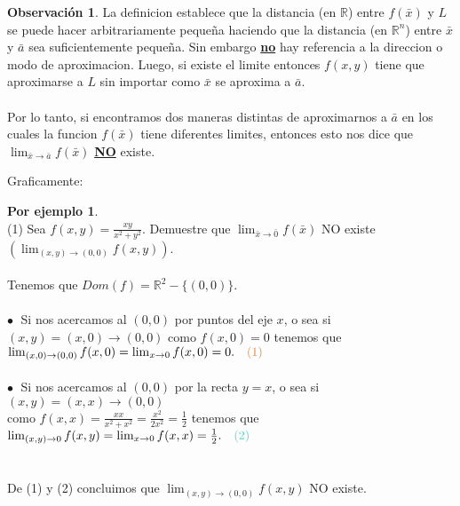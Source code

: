 \documentclass{article}
\theoremstyle{definition}
\newtheorem*{obs}{Observación}
\newtheorem*{ej}{Por ejemplo}
\theoremstyle{remark}
\newcommand\bl{$\bullet\;$}
\begin{document}
\begin{obs}
  La definicion establece que la distancia (en $\mathbb{R}$) entre $f(\bar{x})$ y $L$ se puede hacer arbitrariamente pequeña haciendo que la distancia (en $\mathbb{R}^n$) entre $\bar{x}$ y $\bar{a}$ sea suficientemente pequeña. Sin embargo \underline{\textbf{no}} hay referencia a la direccion o modo de aproximacion. Luego, si existe el limite entonces $f(x,y)$ tiene que aproximarse a $L$ sin importar como $\bar{x}$ se aproxima a $\bar{a}$. \\\\ Por lo tanto, si encontramos dos maneras distintas de aproximarnos a $\bar{a}$ en los cuales la funcion $f(\bar{x})$ tiene diferentes limites, entonces esto nos dice que $\lim_{\bar{x} \to \bar{a}}{f(\bar{x})}$ \underline{\textbf{NO}} existe.
\end{obs}\pagebreak
Graficamente:
\begin{figure}[h]
\centering
\def\svgwidth{0.55\textwidth}

\end{figure}
\begin{ej}
  \; \\
  \textcolor{verdep2}{(1)} Sea $f(x,y)=\frac{xy}{x^2+y^2}$. Demuestre que $\lim_{\bar{x} \to \bar{0}}{f(\bar{x})}$ NO existe $\left(\lim_{(x,y) \to (0,0)}{f(x,y)}\right)$.\\\\
  Tenemos que $Dom(f)=\mathbb{R}^2-\big\{(0,0)\big\}$.\\\\
\textcolor{rojop2}{\bl} Si nos acercamos al $(0,0)$ por puntos del eje $x$, o sea si $(x,y)=(x,0) \to (0,0)$ como $f(x,0)=0$ tenemos que $\lim_{(x,0) \to (0,0)}{f(x,0)}=\lim_{x\to 0}{f(x,0)}=0. \quad \textcolor{rojop2}{(1)}$\\\\
\textcolor{verdep2}{\bl} Si nos acercamos al $(0,0)$ por la recta $y=x$, o sea si $(x,y)=(x,x) \to (0,0)$ \\ como $f(x,x)=\frac{xx}{x^2+x^2}=\frac{x^2}{2x^2}=\frac{1}{2}$ tenemos que \mbox{$\lim_{(x,y) \to 0}{f(x,y)}=\lim_{x\to 0}{f(x,x)}=\frac{1}{2}.\quad \textcolor{verdep2}{\text{(2)}}$}\\\\\\
De \textcolor{rojop2}{(1)} y \textcolor{verdep2}{(2)} concluimos que $\lim_{(x,y)\to(0,0)}{f(x,y)}$ NO existe.
\end{ej}
\begin{figure}[h]
\centering
\def\svgwidth{0.35\textwidth}

\end{figure}
\end{document}
